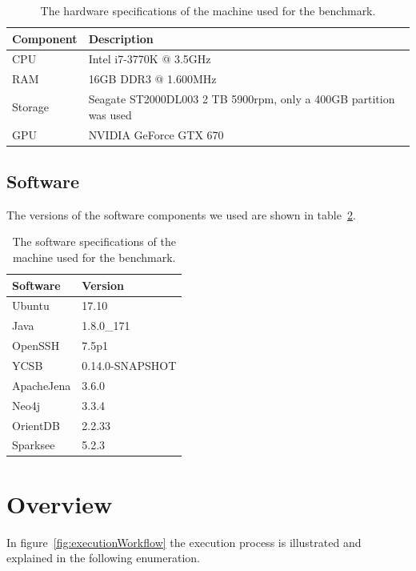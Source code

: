 \begin{table}[!h]
  \begin{minipage}{\textwidth}
    \begin{tabularx}{\textwidth}{ | l | X | }
      \hline
      Component & Description \\ \hline \hline
      CPU & Intel i7-3770K @ 3.5GHz \\ \hline
      RAM & 16GB DDR3 @ 1.600MHz \\ \hline
      Storage & Seagate ST2000DL003 2 TB 5900rpm, only a 400GB partition was used \\ \hline
      GPU & NVIDIA GeForce GTX 670 \\ \hline
    \end{tabularx}
  \end{minipage}
  \caption{The hardware specifications of the machine used for the benchmark.}
  \label{tab:hardware}
\end{table}

\subsection{Software}
The versions of the software components we used are shown in table~\ref{tab:software}.

\begin{table}[!h]
  \begin{minipage}{\textwidth}
    \begin{tabularx}{\textwidth}{ | X | X | }
      \hline
      Software & Version \\ \hline \hline
      Ubuntu & 17.10 \\ \hline
      Java & 1.8.0\_171 \\ \hline
      OpenSSH & 7.5p1 \\ \hline
      YCSB & 0.14.0-SNAPSHOT \\ \hline
      ApacheJena & 3.6.0 \\ \hline
      Neo4j & 3.3.4 \\ \hline
      OrientDB & 2.2.33 \\ \hline
      Sparksee & 5.2.3 \\ \hline
    \end{tabularx}
  \end{minipage}
  \caption{The software specifications of the machine used for the benchmark.}
  \label{tab:software}
\end{table}

\section{Overview}
\label{ch:evaluation:se:overview}
In figure~\ref{fig:executionWorkflow} the execution process is illustrated and explained in the following enumeration.

